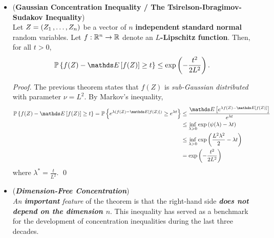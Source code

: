 \documentclass[11pt]{article}
\begin{document}
\begin{itemize}
\item \begin{theorem}  (\textbf{Gaussian Concentration Inequality / The Tsirelson-Ibragimov-Sudakov Inequality}) \citep{boucheron2013concentration, wainwright2019high} \\
Let $Z = (Z_1 \,{,}\ldots{,}\, Z_n)$ be a vector of $n$ \textbf{independent} \textbf{standard normal} random variables. Let $f : {\mathbb R}^n \to {\mathbb R}$ denote an \textbf{$L$-Lipschitz function}. Then, for all $t > 0$, 
\begin{align}
\bP\set{f(Z) - \E{}{f(Z)} \ge t } &\le \exp\paren{- \frac{t^2}{2 L^2}}. \label{ineqn: gaussian_concentration_inequality}
\end{align}
\end{theorem}
\begin{proof}
The previous theorem states that $f(Z)$ is \emph{sub-Gaussian distributed} with parameter $\nu = L^2$. By Markov's inequality, 
\begin{align*}
\bP\set{f(Z) - \E{}{f(Z)} \ge t } = \bP\set{e^{\lambda (f(Z) - \E{}{f(Z)})} \ge e^{\lambda t} }&\le \frac{\E{}{e^{\lambda f(Z) - \E{}{f(Z)}}}}{e^{\lambda t}} \\
&\le \inf_{\lambda >0}\exp\paren{\psi(\lambda) - \lambda t} \\
&\le  \inf_{\lambda >0}\exp\paren{\frac{L^2 \lambda^2}{2}  - \lambda t} \\
&=  \exp\paren{-\frac{t^2}{2L^2}}
\end{align*} where $\lambda^{*} = \frac{t}{L^2}$. \qed
\end{proof}

\item \begin{remark} (\textbf{\emph{Dimension-Free Concentration}}) \\
\emph{An \textbf{important} feature} of the theorem is that the right-hand side \emph{\textbf{does not depend on the dimension $n$}}. This inequality has served as a benchmark for the development of concentration inequalities during the last three decades. 
\end{remark}
\end{itemize}
\end{document}
